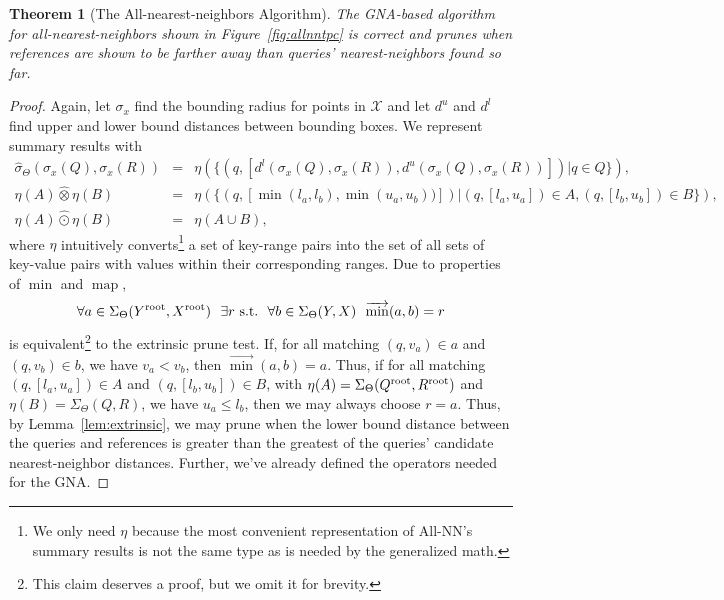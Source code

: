 \documentclass{article}
\newtheorem{theorem}{Theorem}
\newcommand{\killspace}{\vspace{-0.08in}}
\newcommand{\GNP}[1][\psi]{{#1}_{\Theta}}
\newcommand{\sigmahat}{\mathbin{\widehat{\sigma}}}
\newcommand{\otimeshat}{\mathbin{\widehat{\otimes}}}
\newcommand{\odothat}{\mathbin{\widehat{\odot}}}
\DeclareMathOperator*{\map}{map}
\newcommand{\st}{{\rm~s.t.~}}
\newcommand{\disthrectmin}{d^{l}}
\newcommand{\disthrectmax}{d^{u}}
\newcommand{\kdroot}[1]{#1^{\text{\rm root}}}
\newcommand{\kdleft}[1]{#1^{\!L}}
\newcommand{\kdright}[1]{#1^{\!R}}
\begin{document}
\begin{theorem}[The All-nearest-neighbors Algorithm]
  The GNA-based algorithm for all-nearest-neighbors shown in
  Figure~\ref{fig:allnntpc} is correct and prunes when references are
  shown to be farther away than queries' nearest-neighbors found so
  far.
\end{theorem}
\killspace
\killspace
\begin{proof}
  Again, let $\sigma_x$ find the bounding radius for points in $\mathcal{X}$ and let $\disthrectmax$ and $\disthrectmin$ find upper and lower bound distances between bounding boxes.
  We represent summary results with
  \begin{eqnarray*}
    \GNP[\sigmahat](\sigma_x(Q),\sigma_x(R)) & = & \eta(\{(q,[\disthrectmin(\sigma_x(Q),\sigma_x(R)), \disthrectmax(\sigma_x(Q),\sigma_x(R))]) | q \in Q\}), \\
    \eta(A) \otimeshat \eta(B) & = & \eta(\{(q,[\min(l_a,l_b),\min(u_a,u_b))]) | (q,[l_a,u_a]) \in A, (q,[l_b,u_b]) \in B\}), \\
    \eta(A) \odothat \eta(B) & = & \eta(A \cup B),
  \end{eqnarray*}
  where $\eta$ intuitively converts\footnote{We only need $\eta$
  because the most convenient representation of All-NN's summary
  results is not the same type as is needed by the generalized math.}
  a set of key-range pairs into the set of all sets of key-value pairs
  with values within their corresponding ranges.  Due to properties of
  $\min$ and $\map$,
  \[
  \forall a \in \GNP[\Sigma](\kdroot{Y},\kdroot{X})~~ \exists r \st~ \forall b \in \GNP[\Sigma](Y,X)~~ \overrightarrow{\min}(a,b) = r
  \]
  is equivalent\footnote{This claim deserves a proof, but we omit it
  for brevity.} to the extrinsic prune test.  If, for all matching
  $(q,v_a) \in a$ and $(q,v_b) \in b$, we have $v_a < v_b$, then
  $\overrightarrow{\min}(a,b) = a$.  Thus, if for all matching
  $(q,[l_a,u_a]) \in A$ and $(q,[l_b,u_b]) \in B$, with $\eta(A) =
  \GNP[\Sigma](\kdroot{Q},\kdroot{R})$ and $\eta(B) =
  \GNP[\Sigma](Q,R)$, we have $u_a \leq l_b$, then we may always
  choose $r = a$.  Thus, by Lemma~\ref{lem:extrinsic}, we may prune
  when the lower bound distance between the queries and references is
  greater than the greatest of the queries' candidate nearest-neighbor
  distances.  Further, we've already defined the operators needed for
  the GNA.
\end{proof}
\end{document}
